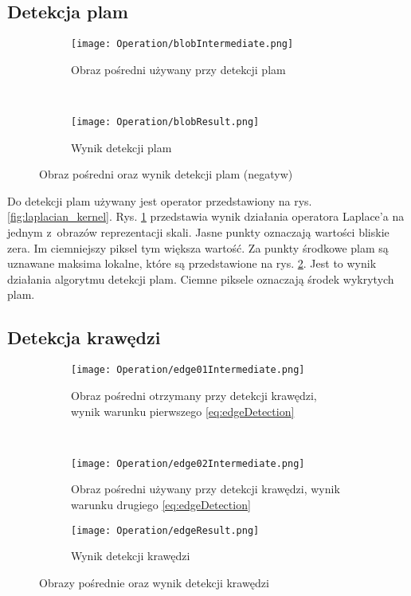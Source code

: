 \subsection{Detekcja plam}
\label{sec:dzialanieBlob}

\begin{figure}[h]
\begin{center}

\begin{subfigure}[t]{0.3\textwidth}
\texttt{[image: Operation/blobIntermediate.png]}
\caption{Obraz pośredni używany przy detekcji plam}
\label{fig:blobIntermediate}
\end{subfigure}
~
\begin{subfigure}[t]{0.3\textwidth}
\texttt{[image: Operation/blobResult.png]}
\caption{Wynik detekcji plam}
\label{fig:blobResult}
\end{subfigure}

\end{center}
\label{fig:showBlob}
\caption{Obraz pośredni oraz wynik detekcji plam (negatyw)}
\end{figure}

Do detekcji plam używany jest operator przedstawiony na rys. \ref{fig:laplacian_kernel}. Rys. \ref{fig:blobIntermediate} przedstawia wynik działania operatora Laplace'a na jednym z~obrazów reprezentacji skali. Jasne punkty oznaczają wartości bliskie zera. Im ciemniejszy piksel tym większa wartość. Za punkty środkowe plam są uznawane maksima lokalne, które są przedstawione na rys. \ref{fig:blobResult}. Jest to wynik działania algorytmu detekcji plam. Ciemne piksele oznaczają środek wykrytych plam.

\subsection{Detekcja krawędzi}
\label{sec:dzialanieEdge}

\begin{figure}[h]
\begin{center}

\begin{subfigure}[t]{0.3\textwidth}
\texttt{[image: Operation/edge01Intermediate.png]}
\caption{Obraz pośredni otrzymany przy detekcji krawędzi, wynik warunku pierwszego \eqref{eq:edgeDetection}}
\label{fig:edgeIntermediate1}
\end{subfigure}
~
\begin{subfigure}[t]{0.3\textwidth}
\texttt{[image: Operation/edge02Intermediate.png]}
\caption{Obraz pośredni używany przy detekcji krawędzi, wynik warunku drugiego \eqref{eq:edgeDetection}}
\label{fig:edgeIntermediate2}
\end{subfigure}

\begin{subfigure}[t]{0.3\textwidth}
\texttt{[image: Operation/edgeResult.png]}
\caption{Wynik detekcji krawędzi}
\label{fig:edgeResult}
\end{subfigure}

\end{center}
\label{fig:showEdge}
\caption{Obrazy pośrednie oraz wynik detekcji krawędzi}
\end{figure}

